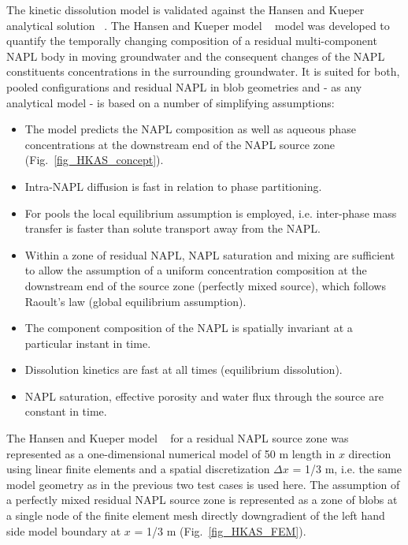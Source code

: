 The kinetic dissolution model is validated against the Hansen and Kueper analytical solution ~\cite{HanKue:07}. The  Hansen and Kueper model ~\cite{HanKue:07} model was developed to quantify the temporally changing composition of a residual multi-component NAPL body in moving groundwater and the consequent changes of the NAPL constituents concentrations in the surrounding groundwater. It is suited for both, pooled configurations and residual NAPL in blob geometries and - as any analytical model - is based on a number of simplifying assumptions:
\newenvironment{bulletpopints}{\begin{itemize}}{\end{itemize}}
\begin{bulletpopints}
 \item The model predicts the NAPL composition as well as aqueous phase concentrations at the downstream end of the NAPL source zone (Fig.~\ref{fig_HKAS_concept}).
\item  Intra-NAPL diffusion is fast in relation to phase partitioning.
\item  For pools the local equilibrium assumption is employed, i.e. inter-phase mass transfer is faster than solute transport away from the NAPL.
\item  Within a zone of residual NAPL, NAPL saturation and mixing are sufficient to allow the assumption of a uniform concentration composition at the downstream end of the source zone (perfectly mixed source), which follows Raoult's law (global equilibrium assumption).
\item  The component composition of the NAPL is spatially invariant at a particular instant in time.
\item  Dissolution kinetics are fast at all times (equilibrium dissolution).
\item  NAPL saturation, effective porosity and water flux through the source are constant in time.
\end{bulletpopints}

The Hansen and Kueper model ~\cite{HanKue:07} for a residual NAPL source zone was represented as a one-dimensional numerical model of 50 m length in $x$ direction using linear finite elements and a spatial discretization $\Delta x$ = 1/3 m, i.e. the same model geometry as in the previous two test cases is used here. The assumption of a perfectly mixed residual NAPL source zone is represented as a zone of blobs at a single node of the finite element mesh directly downgradient of the left hand side model boundary at $x$ = 1/3 m (Fig.~\ref{fig_HKAS_FEM}).

